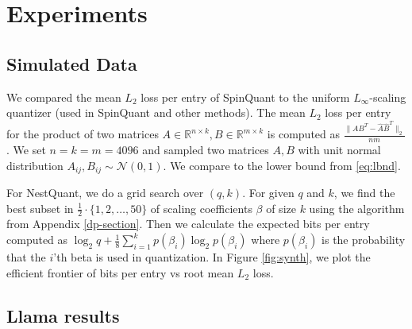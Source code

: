 \documentclass{article}
\theoremstyle{plain}
\theoremstyle{definition}
\theoremstyle{remark}
\begin{document}
\section{Experiments}\label{sec:exper}
\subsection{Simulated Data}\label{sec:synth}
    We compared the mean $L_2$ loss per entry of SpinQuant to the uniform $L_\infty$-scaling quantizer (used in SpinQuant and other methods).
    The mean $L_2$ loss per entry for the product of two matrices $A \in \mathbb{R}^{n\times k}, B\in \mathbb{R}^{m\times k}$ is computed as $\frac{\lVert AB^T - \hat{A}\hat{B}^T\rVert_2}{nm}$.
    We set $n=k=m=4096$ and sampled two matrices $A,B$ with unit normal distribution $A_{ij},B_{ij} \sim \mathcal{N}(0,1)$. 
    We compare to the lower bound from \eqref{eq:lbnd}.

For NestQuant, we do a grid search over $(q, k)$. For given $q$ and $k$, we find the best subset in $\frac{1}{2}\cdot\{1,2,\ldots,50\}$ of scaling coefficients $\beta$ of size $k$ using the algorithm from Appendix \ref{dp-section}. Then we calculate the expected bits per entry computed as $\log_2{q}+\frac{1}{8}\sum_{i=1}^kp(\beta_{i})\log_2 p(\beta_{i})$ where $p(\beta_{i})$ is the probability that the $i$'th beta is used in quantization. In Figure \ref{fig:synth}, we plot the efficient frontier of bits per entry vs root mean $L_2$ loss.

\subsection{Llama results}
\end{document}
